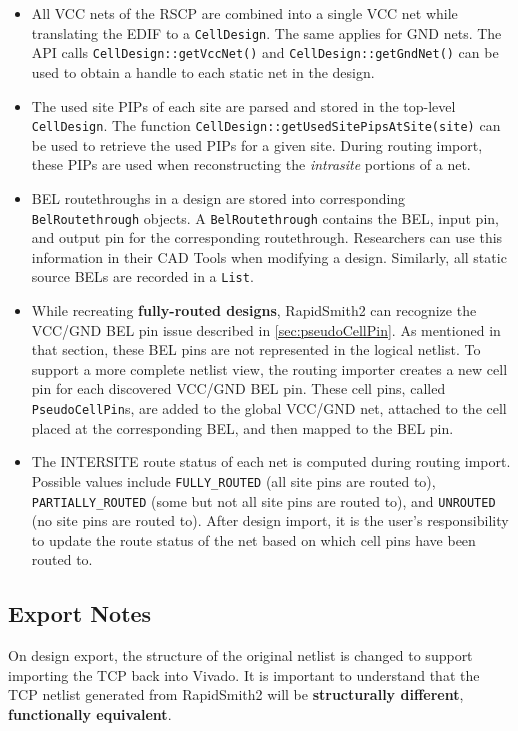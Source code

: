 \begin{itemize}
  \item All VCC nets of the RSCP are combined into a single VCC net while
  translating the EDIF to a \texttt{Cell\-Design}. The same applies for GND
  nets.
  The API calls \texttt{CellDesign::get\-VccNet()} and
  \texttt{CellDesign::get\-GndNet()} can be used to obtain a handle to each
  static net in the design.
  
  \item The used site PIPs of each site are parsed and stored in the top-level
  \texttt{Cell\-Design}. The function
  \texttt{CellDes\-ign::getUsedSitePipsAtSite(site)} can be used to retrieve the
  used PIPs for a given site. During routing import, these PIPs are used when
  reconstructing the \textit{intrasite} portions of a net.
  
  \item BEL routethroughs in a design are stored into corresponding
  \texttt{BelRoutethrough} objects. A \texttt{BelRouteth\-rough} contains the
  BEL, input pin, and output pin for the corresponding routethrough. Researchers
  can use this information in their CAD Tools when modifying a design.
  Similarly, all static source BELs are recorded in a \texttt{List}.
  
  \item While recreating \textbf{fully-routed designs}, RapidSmith2 can
  recognize the VCC/GND BEL pin issue described in \autoref{sec:pseudoCellPin}.
  As mentioned in that section, these BEL pins are not represented in the
  logical netlist. To support a more complete netlist view, the
  routing importer creates a new cell pin for each discovered VCC/GND BEL
  pin. These cell pins, called \texttt{PseudoCellPin}s, are added
  to the global VCC/GND net, attached to the cell placed at the
  corresponding BEL, and then mapped to the BEL pin.
  
  \item The INTERSITE route status of each net is computed during routing
  import. Possible values include \texttt{FULLY\_RO\-UTED} (all site pins are
  routed to), \texttt{PARTIALLY\_ROU\-TED} (some but not all site pins are
  routed to), and \texttt{UNROU\-TED} (no site pins are routed to). After design
  import, it is the user's responsibility to update the route status of the net
  based on which cell pins have been routed to.
  
\end{itemize}

\subsection{Export Notes}
On design export, the structure of the original netlist is changed to support
importing the TCP back into Vivado. It is important to understand that the TCP
netlist generated from RapidSmith2 will be \textbf{structurally different},
\textbf{functionally equivalent}.

